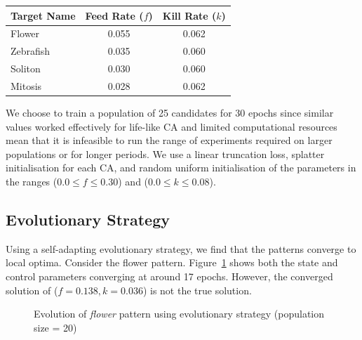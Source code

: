 \begin{center}
    \begin{tabular}{ |l|c|c| }
        \hline
        Target Name & Feed Rate ($f$) & Kill Rate ($k$)\\
        \hline
        Flower & 0.055 & 0.062\\
        Zebrafish & 0.035 & 0.060\\
        Soliton & 0.030 & 0.060\\
        Mitosis & 0.028 & 0.062\\
        \hline
    \end{tabular}
\end{center}

We choose to train a population of 25 candidates for 30 epochs since similar values worked effectively for life-like CA and limited computational resources mean that it is infeasible to run the range of experiments required on larger populations or for longer periods. We use a linear truncation loss, splatter initialisation for each CA, and random uniform initialisation of the parameters in the ranges ($0.0 \leq f \leq 0.30$) and ($0.0 \leq k \leq 0.08$).

\subsection{Evolutionary Strategy}

Using a self-adapting evolutionary strategy, we find that the patterns converge to local optima. Consider the flower pattern. Figure~\ref{fig:flower-fail} shows both the state and control parameters converging at around 17 epochs. However, the converged solution of ($f = 0.138, k = 0.036$) is not the true solution.\\

\begin{figure}[!h]
\centering
            \hfill
            \hfill
            \caption{Evolution of \textit{flower} pattern using evolutionary strategy (population size = 20)}
\label{fig:flower-fail}
\end{figure}

